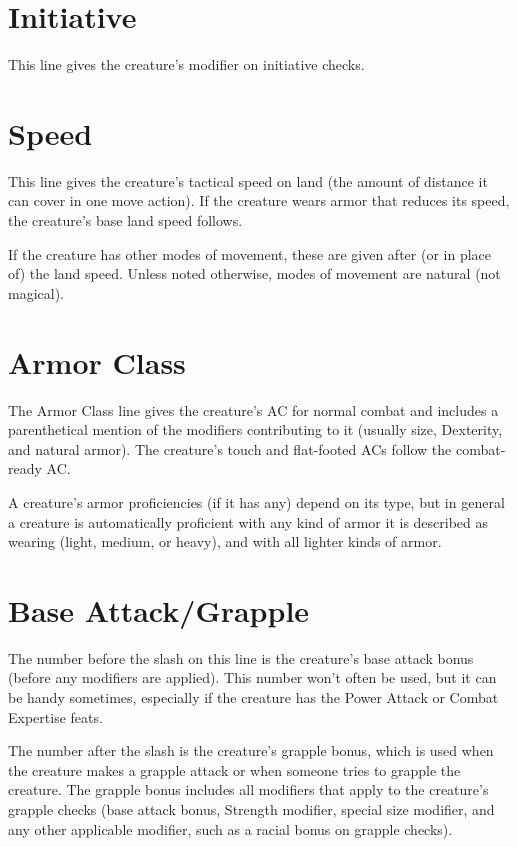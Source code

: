 \documentclass{article}
\begin{document}
\section*{\textbf{Initiative}}

This line gives the creature's modifier on initiative checks.

\section*{\textbf{Speed}}

This line gives the creature's tactical speed on land (the amount of distance it 
can cover in one move action). If the creature wears armor that reduces its speed, 
the creature's base land speed follows.

If the creature has other modes of movement, these are given after (or in place 
of) the land speed. Unless noted otherwise, modes of movement are natural (not 
magical).

\section*{\textbf{Armor Class}}

The Armor Class line gives the creature's AC for normal combat and includes a parenthetical 
mention of the modifiers contributing to it (usually size, Dexterity, and natural 
armor). The creature's touch and flat-footed ACs follow the combat-ready AC.

A creature's armor proficiencies (if it has any) depend on its type, but in general 
a creature is automatically proficient with any kind of armor it is described as 
wearing (light, medium, or heavy), and with all lighter kinds of armor.

\section*{\textbf{Base Attack/Grapple}}

The number before the slash on this line is the creature's base attack bonus (before 
any modifiers are applied). This number won't often be used, but it can be handy 
sometimes, especially if the creature has the Power Attack or Combat Expertise 
feats.

The number after the slash is the creature's grapple bonus, which is used when 
the creature makes a grapple attack or when someone tries to grapple the creature. 
The grapple bonus includes all modifiers that apply to the creature's grapple checks 
(base attack bonus, Strength modifier, special size modifier, and any other applicable 
modifier, such as a racial bonus on grapple checks).
\end{document}
